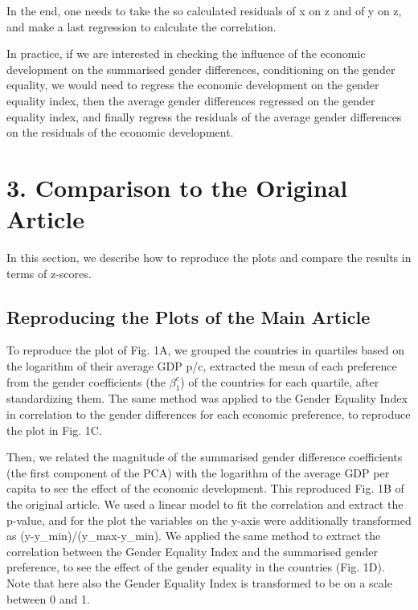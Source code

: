 \documentclass[
  11pt,
]{article}
\begin{document}
In the end, one needs to take the so calculated residuals of x on z and
of y on z, and make a last regression to calculate the correlation.

In practice, if we are interested in checking the influence of the
economic development on the summarised gender differences, conditioning
on the gender equality, we would need to regress the economic
development on the gender equality index, then the average gender
differences regressed on the gender equality index, and finally regress
the residuals of the average gender differences on the residuals of the
economic development.

\hypertarget{comparison-to-the-original-article}{%
\section{3. Comparison to the Original
Article}\label{comparison-to-the-original-article}}

In this section, we describe how to reproduce the plots and compare the
results in terms of z-scores.

\hypertarget{reproducing-the-plots-of-the-main-article}{%
\subsection{Reproducing the Plots of the Main
Article}\label{reproducing-the-plots-of-the-main-article}}

To reproduce the plot of Fig. 1A, we grouped the countries in quartiles
based on the logarithm of their average GDP p/c, extracted the mean of
each preference from the gender coefficients (the \(\beta_1^c\)) of the
countries for each quartile, after standardizing them. The same method
was applied to the Gender Equality Index in correlation to the gender
differences for each economic preference, to reproduce the plot in Fig.
1C.

Then, we related the magnitude of the summarised gender difference
coefficients (the first component of the PCA) with the logarithm of the
average GDP per capita to see the effect of the economic development.
This reproduced Fig. 1B of the original article. We used a linear model
to fit the correlation and extract the p-value, and for the plot the
variables on the y-axis were additionally transformed as
(y-y\_min)/(y\_max-y\_min). We applied the same method to extract the
correlation between the Gender Equality Index and the summarised gender
preference, to see the effect of the gender equality in the countries
(Fig. 1D). Note that here also the Gender Equality Index is transformed
to be on a scale between 0 and 1.
\end{document}
